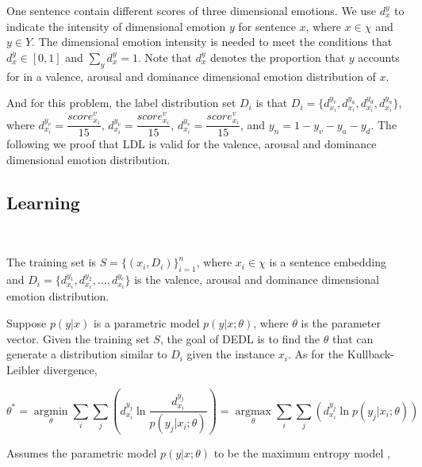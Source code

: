 One sentence contain different scores of 
three dimensional emotions. 
We use $ d^y_{x} $ to indicate the intensity of 
dimensional emotion $ y $ for sentence $ x $, 
where $ x \in \chi  $ and $ y \in Y $.
The dimensional emotion intensity is needed to
meet the conditions that
$ d^y_{x} \in [0,1] $ and $\sum_{y}  d^y_{x} = 1$.
Note that $ d^y_{x} $ denotes the proportion that 
$ y $ accounts for in a valence, 
arousal  and dominance dimensional emotion distribution
of $ x $.

And for this problem,
the label distribution set $ D_{i} $ is that
$ D_{i} = \{d^{y_{v}}_{x_{i}},  d^{y_{a}}_{x_{i}}, d^{y_{d}}_{x_{i}}, d^{y_{n}}_{x_{i}}\} $,
where
$ d^{y_{v}}_{x_{i}} = \dfrac{score^{v}_{x_{i}}}{15} $,
$ d^{y_{v}}_{x_{i}} = \dfrac{score^{v}_{x_{i}}}{15} $,
$ d^{y_{v}}_{x_{i}} = \dfrac{score^{v}_{x_{i}}}{15} $,
and $ y_{n} = 1 - y_{v}  - y_{a} - y_{d} $.
The following we proof that 
LDL is valid for the valence, arousal  
and dominance dimensional emotion distribution.



\subsection{Learning}
\

The training set is $ S = \{ ( x_{i} , D_{i} )  \}^{n}_{i=1} $,
where $ x_{i} \in \chi $ is a sentence embedding and
$ D_{i} = \{d^{y_{1}}_{x_{i}},  d^{y_{2}}_{x_{i}}, ... , d^{y_{c}}_{x_{i}}\} $
is the valence, arousal  and dominance dimensional emotion distribution.

Suppose $ p(y|x) $  is a parametric model
$ p(y|x;{\theta}) $, 
where  $ \theta $ is the parameter vector. 
Given the training set $ S $, 
the goal of DEDL is to find the $ \theta $ that 
can generate a distribution similar to $ D_{i} $
given the instance $ x_{i} $.
As for the Kullback-Leibler divergence,

\begin{equation}\label{eq:kl_divergence}
\theta^{\ast} =
\mathop{\arg\min}\limits_{\theta}
\sum\limits_{i}
\sum\limits_{j}
(d^{y_{j}}_{ x_{ i } }
\ln \dfrac{ d^{y_{j}}_{ x_{ i } } }{ p( y_{ j } | x_{ i } ;{\theta}) })
=\mathop{\arg\max}\limits_{\theta}
\sum\limits_{i}
\sum\limits_{j}
(d^{y_{j}}_{ x_{ i } }
\ln { p( y_{ j } | x_{ i } ;{\theta}) })
\end{equation}

Assumes the parametric model 
$ p(y|x;{\theta}) $ 
to be the maximum entropy model
\cite{BERGER1996},	

